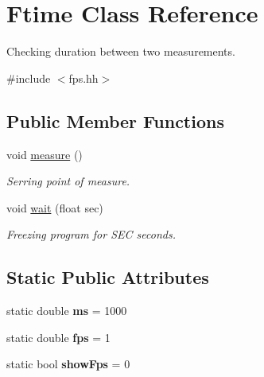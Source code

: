 \hypertarget{class_ftime}{}\section{Ftime Class Reference}
\label{class_ftime}


Checking duration between two measurements.  




{\ttfamily \#include $<$fps.\+hh$>$}

\subsection*{Public Member Functions}
\begin{DoxyCompactItemize}
\item 
\mbox{\label{class_ftime_a4b2418b249d492c27aef5aa3b1fe3750}} 
void \hyperlink{class_ftime_a4b2418b249d492c27aef5aa3b1fe3750}{measure} ()
\begin{DoxyCompactList}\small\item\em Serring point of measure. \end{DoxyCompactList}\item 
void \hyperlink{class_ftime_a64b93ed0af61a91a18f053098079afad}{wait} (float sec)
\begin{DoxyCompactList}\small\item\em Freezing program for S\+EC seconds. \end{DoxyCompactList}\end{DoxyCompactItemize}
\subsection*{Static Public Attributes}
\begin{DoxyCompactItemize}
\item 
\mbox{\label{class_ftime_a121c6d6eb7125694fcc43fd77da56409}} 
static double {\bfseries ms} = 1000
\item 
\mbox{\label{class_ftime_ae03e73c800166ebdb721977554c1816d}} 
static double {\bfseries fps} = 1
\item 
\mbox{\label{class_ftime_ae4cfb4d581e544d598f3fa62c532edc1}} 
static bool {\bfseries show\+Fps} = 0
\end{DoxyCompactItemize}


